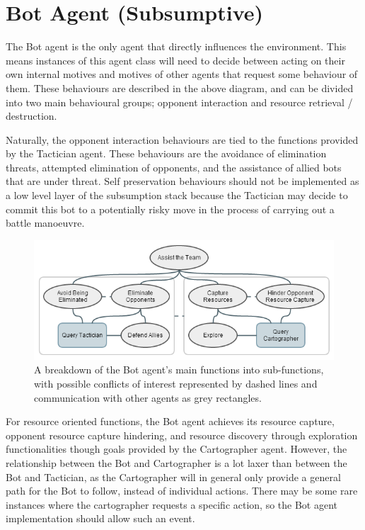 \documentclass[a4paper,10pt]{article}
\begin{document}
\section{Bot Agent (Subsumptive)}

The Bot agent is the only agent that directly influences the environment. This means instances of this agent class will need to decide between acting on their own internal motives and motives of other agents that request some behaviour of them. These behaviours are described in the above diagram, and can be divided into two main behavioural groups; opponent interaction and resource retrieval / destruction.

Naturally, the opponent interaction behaviours are tied to the functions provided by the Tactician agent. These behaviours are the avoidance of elimination threats, attempted elimination of opponents, and the assistance of allied bots that are under threat. Self preservation behaviours should not be implemented as a low level layer of the subsumption stack because the Tactician may decide to commit this bot to a potentially risky move in the process of carrying out a battle manoeuvre.

\begin{figure}[!ht]
  \centering
  \includegraphics[width=0.8\linewidth]{bot}
  \begin{minipage}[t]{0.8\textwidth}
    \caption{A breakdown of the Bot agent's main functions into sub-functions, with possible conflicts of interest represented by dashed lines and communication with other agents as grey rectangles.}
  \end{minipage}
\end{figure}

For resource oriented functions, the Bot agent achieves its resource capture, opponent resource capture hindering, and resource discovery through exploration functionalities though goals provided by the Cartographer agent. However, the relationship between the Bot and Cartographer is a lot laxer than between the Bot and Tactician, as the Cartographer will in general only provide a general path for the Bot to follow, instead of individual actions. There may be some rare instances where the cartographer requests a specific action, so the Bot agent implementation should allow such an event.
\end{document}
